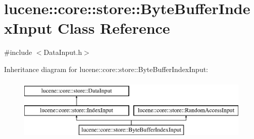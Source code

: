 \hypertarget{classlucene_1_1core_1_1store_1_1ByteBufferIndexInput}{}\section{lucene\+:\+:core\+:\+:store\+:\+:Byte\+Buffer\+Index\+Input Class Reference}
\label{classlucene_1_1core_1_1store_1_1ByteBufferIndexInput}


{\ttfamily \#include $<$Data\+Input.\+h$>$}

Inheritance diagram for lucene\+:\+:core\+:\+:store\+:\+:Byte\+Buffer\+Index\+Input\+:\begin{figure}[H]
\begin{center}
\leavevmode
\includegraphics[height=3.000000cm]{classlucene_1_1core_1_1store_1_1ByteBufferIndexInput}
\end{center}
\end{figure}
